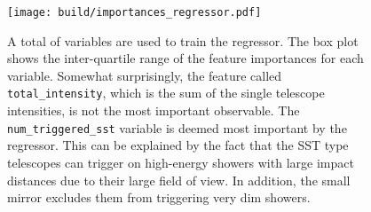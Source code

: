 \begin{figure}[]
    \centering
    \texttt{[image: build/importances\_regressor.pdf]}
    \caption[Feature importance of the energy regressor]{A total of  variables are used to train the regressor.
    The box plot shows the inter-quartile range of the feature importances for each variable. Somewhat surprisingly, 
    the feature called \texttt{total\_intensity}, which is the sum of the single telescope intensities, is not the most important 
    observable. The \texttt{num\_triggered\_sst} variable is deemed most important by the regressor. This can be explained by the fact 
    that the SST type telescopes can trigger on high-energy showers with large impact distances due to their large field of view.
    In addition, the small mirror excludes them from triggering very dim showers. 
    }
    \label{fig:regressor_importance}
\end{figure}







